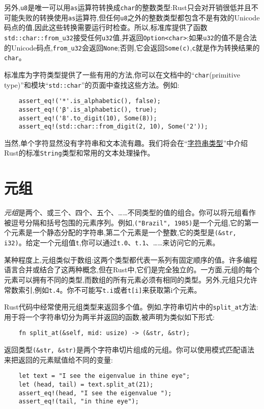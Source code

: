 另外,\texttt{u8}是唯一可以用\texttt{as}运算符转换成\texttt{char}的整数类型:Rust只会对开销很低并且不可能失败的转换使用\texttt{as}运算符,但任何\texttt{u8}之外的整数类型都包含不是有效的Unicode码点的值,因此这些转换需要运行时检查。所以,标准库提供了函数\texttt{std::char::from\_u32}接受任何\texttt{u32}值,并返回\texttt{Option<char>}:如果\texttt{u32}的值不是合法的Unicode码点,\texttt{from\_u32}会返回\texttt{None};否则,它会返回\texttt{Some(c)},\texttt{c}就是作为转换结果的\texttt{char}。

标准库为字符类型提供了一些有用的方法,你可以在文档中的“\texttt{char}(primitive type)”和模块“\texttt{std::char}”的页面中查找这些方法。例如:
\begin{verbatim}
    assert_eq!('*'.is_alphabetic(), false);
    assert_eq!('β'.is_alphabetic(), true);
    assert_eq!('8'.to_digit(10), Some(8));
    assert_eq!(std::char::from_digit(2, 10), Some('2'));
\end{verbatim}

当然,单个字符显然没有字符串和文本流有趣。我们将会在“\hyperref[string]{字符串类型}”中介绍Rust的标准\texttt{String}类型和常用的文本处理操作。

\section{元组}
\emph{元组}是两个、或三个、四个、五个、……不同类型的值的组合。你可以将元组看作被逗号分隔和括号包围的元素序列。例如,\texttt{("Brazil", 1985)}是一个元组,它的第一个元素是一个静态分配的字符串,第二个元素是一个整数,它的类型是\texttt{(\&str, i32)}。给定一个元组值\texttt{t},你可以通过\texttt{t.0}、\texttt{t.1}、……来访问它的元素。

某种程度上,元组类似于数组:这两个类型都代表一系列有固定顺序的值。许多编程语言合并或结合了这两种概念,但在Rust中,它们是完全独立的。一方面,元组的每个元素可以拥有不同的类型,而数组的所有元素必须有相同的类型。另外,元组只允许常数索引,例如\texttt{t.4}。你不可能写\texttt{t.i}或者\texttt{t[i]}来获取第i个元素。

Rust代码中经常使用元组类型来返回多个值。例如,字符串切片中的\texttt{split\_at}方法:用于将一个字符串切分为两半并返回的函数,被声明为类似如下形式:
\begin{verbatim}
    fn split_at(&self, mid: usize) -> (&str, &str);
\end{verbatim}

返回类型\texttt{(\&str, \&str)}是两个字符串切片组成的元组。你可以使用模式匹配语法来把返回的元素赋值给不同的变量:
\begin{verbatim}
    let text = "I see the eigenvalue in thine eye";
    let (head, tail) = text.split_at(21);
    assert_eq!(head, "I see the eigenvalue ");
    assert_eq!(tail, "in thine eye");
\end{verbatim}

